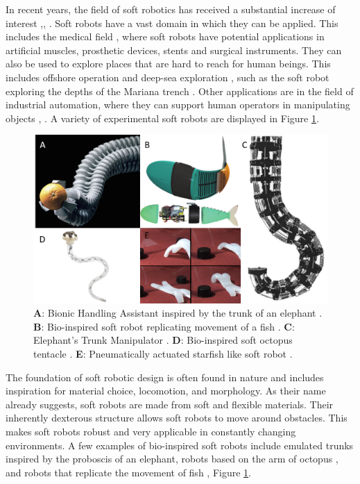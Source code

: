 \label{chapter1}

In recent years, the field of soft robotics has received a substantial increase of interest \cite{iida2011soft},\cite{walker2020soft}, \cite{bao2018soft}. Soft robots have a vast domain in which they can be applied. This includes the medical field \cite{sitti2018miniature} \cite{ashuri2020biomedical}, where soft robots have potential applications in artificial muscles, prosthetic devices, stents and surgical instruments. They can also be used to explore places that are hard to reach for human beings. This includes offshore operation and deep-sea exploration \cite{aracri2021soft}, such as the soft robot exploring the depths of the Mariana trench \cite{laschi2021soft}. Other applications are in the field of industrial automation, where they can support human operators in manipulating objects \cite{george2018control}, \cite{grissom2006design}. A variety of experimental soft robots are displayed in Figure \ref{fig1:softexample}. 



\begin{figure}[H]       
    \centering
    \includegraphics[width = \textwidth]{Figures/Chapter1/robotexamples.png}
    \caption{\textbf{A}: Bionic Handling Assistant inspired by the trunk of an elephant \cite{BHA}. \textbf{B}: Bio-inspired soft robot replicating movement of a fish \cite{marchese2014}. \textbf{C}: Elephant’s Trunk Manipulator \cite{hannan2003kinematics}. \textbf{D}: Bio-inspired soft octopus tentacle \cite{laschi2012soft}. \textbf{E}: Pneumatically actuated starfish like soft robot \cite{shepherd2011multigait}.}
    \label{fig1:softexample}
\end{figure}


The foundation of soft robotic design is often found in nature and includes inspiration for material choice, locomotion, and morphology. As their name already suggests, soft robots are made from soft and flexible materials. Their inherently dexterous structure allows soft robots to move around obstacles. This makes soft robots robust and very applicable in constantly changing environments. A few examples of bio-inspired soft robots include emulated trunks \cite{hannan2003kinematics} inspired by the proboscis of an elephant, robots based on the arm of octopus \cite{wang2013visual}, and robots that replicate the movement of fish \cite{marchese2014}, Figure \ref{fig1:softexample}. 


